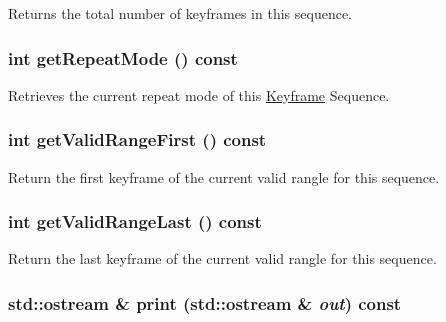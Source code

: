 Returns the total number of keyframes in this sequence. \hypertarget{classm3g_1_1KeyframeSequence_a356af60b9759d5d3da833773e3c7b73}{
\subsubsection[{getRepeatMode}]{\setlength{\rightskip}{0pt plus 5cm}int getRepeatMode () const}}
\label{classm3g_1_1KeyframeSequence_a356af60b9759d5d3da833773e3c7b73}


Retrieves the current repeat mode of this \hyperlink{classm3g_1_1Keyframe}{Keyframe} Sequence. \hypertarget{classm3g_1_1KeyframeSequence_b7e54386674cefdb8f5fa65ce5435b50}{
\subsubsection[{getValidRangeFirst}]{\setlength{\rightskip}{0pt plus 5cm}int getValidRangeFirst () const}}
\label{classm3g_1_1KeyframeSequence_b7e54386674cefdb8f5fa65ce5435b50}


Return the first keyframe of the current valid rangle for this sequence. \hypertarget{classm3g_1_1KeyframeSequence_aa98cc8d698c482c33a3487c33db27d0}{
\subsubsection[{getValidRangeLast}]{\setlength{\rightskip}{0pt plus 5cm}int getValidRangeLast () const}}
\label{classm3g_1_1KeyframeSequence_aa98cc8d698c482c33a3487c33db27d0}


Return the last keyframe of the current valid rangle for this sequence. \hypertarget{classm3g_1_1KeyframeSequence_6fea17fa1532df3794f8cb39cb4f911f}{
\subsubsection[{print}]{\setlength{\rightskip}{0pt plus 5cm}std::ostream \& print (std::ostream \& {\em out}) const}}
\label{classm3g_1_1KeyframeSequence_6fea17fa1532df3794f8cb39cb4f911f}


